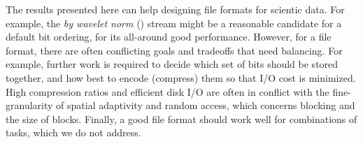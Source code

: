 The results presented here can help designing file formats for scientic data. For example, the
\emph{by wavelet norm} (\swav) stream might be a reasonable candidate for a default bit ordering,
for its all-around good performance. However, for a file format, there are often conflicting goals
and tradeoffs that need balancing. For example, further work is required to decide which set of bits
should be stored together, and how best to encode (compress) them so that I/O cost is minimized.
High compression ratios and efficient disk I/O are often in conflict with the fine-granularity of
spatial adaptivity and random access, which concerns blocking and the size of blocks. Finally, a
good file format should work well for combinations of tasks, which we do not address.


